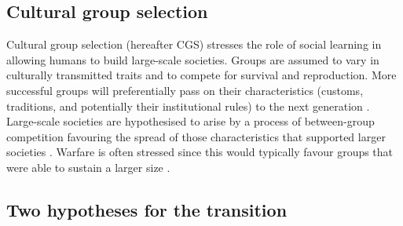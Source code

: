 \documentclass[10pt, a4paper, fleqn]{article}
\begin{document}
\subsection*{Cultural group selection}
Cultural group selection (hereafter CGS) stresses the role of social learning in allowing humans to build large-scale societies. Groups are assumed to vary in culturally transmitted traits and to compete for survival and reproduction. More successful groups will preferentially pass on their characteristics (customs, traditions, and potentially their institutional rules) to the next generation \citep{Richerson:2016:a, Turchin:2010:a,Turchin:2015:b}. Large-scale societies are hypothesised to arise by a process of between-group competition favouring the spread of those characteristics that supported larger societies \citep{Henrich:2016:b}. Warfare is often stressed since this would typically favour groups that were able to sustain a larger size \citep{Turchin:2013:a,Turchin:2015:b}. 



\subsection*{Two hypotheses for the transition}
\end{document}
